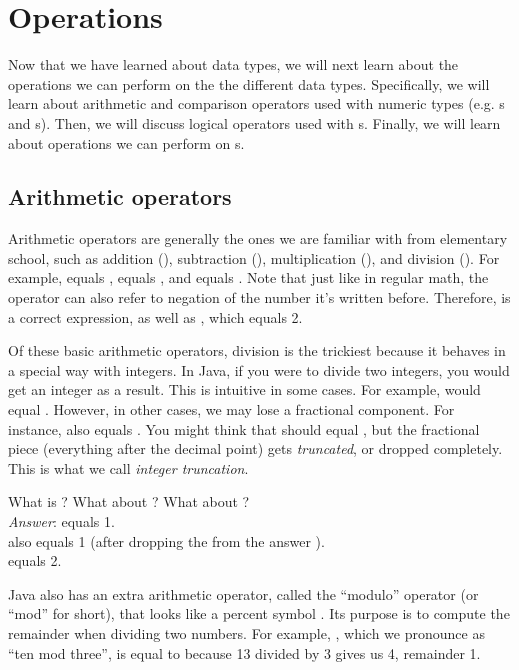 \section{Operations}
Now that we have learned about data types, we will next learn about the operations we can perform on the the different data types. Specifically, we will learn about arithmetic and comparison operators used with numeric types (e.g. s and s). Then, we will discuss logical operators used with s. Finally, we will learn about operations we can perform on s.

\subsection{Arithmetic operators}
Arithmetic operators are generally the ones we are familiar with from elementary school, such as addition (\ic{+}), subtraction (\ic{-}), multiplication (\ic{*}), and division (\ic{/}). For example,  equals ,  equals , and  equals . Note that just like in regular math, the operator \ic{-} can also refer to negation of the number it's written before. Therefore,  is a correct expression, as well as , which equals 2.

Of these basic arithmetic operators, division is the trickiest because it behaves in a special way with integers. In Java, if you were to divide two integers, you would get an integer as a result. This is intuitive in some cases. For example,  would equal . However, in other cases, we may lose a fractional component. For instance,  also equals . You might think that  should equal , but the fractional piece (everything after the decimal point) gets \emph{truncated}, or dropped completely. This is what we call \emph{integer truncation}.

\begin{example}
What is ? What about ? What about ? \\

\noindent \emph{Answer}:  equals {1}. \\
 also equals {1} (after dropping the  from the answer ). \\
 equals {2}.
\end{example}

Java also has an extra arithmetic operator, called the ``modulo'' operator (or ``mod'' for short), that looks like a percent symbol \ic{\%}. Its purpose is to compute the remainder when dividing two numbers. For example, , which we pronounce as ``ten mod three'', is equal to  because 13 divided by 3 gives us 4, remainder 1.

